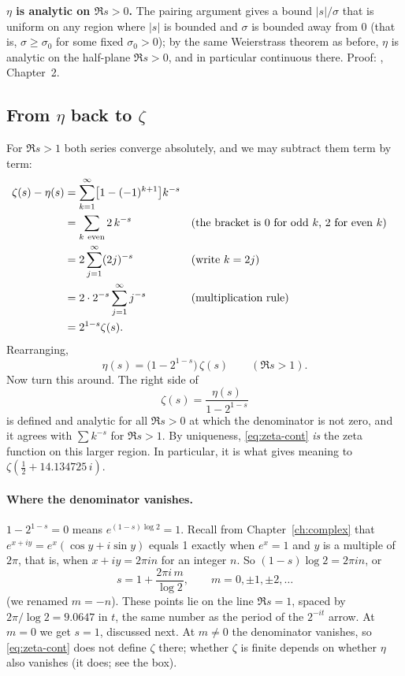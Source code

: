 \begin{beyond}
\textbf{$\eta$ is analytic on $\Re s>0$.} The pairing argument gives a bound $|s|/\sigma$ that is uniform on any region where $|s|$ is bounded and $\sigma$ is bounded away from $0$ (that is, $\sigma\ge\sigma_0$ for some fixed $\sigma_0>0$); by the same Weierstrass theorem as before, $\eta$ is analytic on the half-plane $\Re s>0$, and in particular continuous there. Proof: \cite{titchmarsh}, Chapter~2.
\end{beyond}

\subsection{From $\eta$ back to $\zeta$}

For $\Re s>1$ both series converge absolutely, and we may subtract them term by term:
\begin{align}
\zeta(s)-\eta(s)&=\sum_{k=1}^\infty\bigl[1-(-1)^{k+1}\bigr]k^{-s}\notag\\
&=\sum_{k\ \mathrm{even}}2\,k^{-s} &&\text{(the bracket is 0 for odd $k$, 2 for even $k$)}\notag\\
&=2\sum_{j=1}^{\infty}(2j)^{-s} &&\text{(write $k=2j$)}\notag\\
&=2\cdot2^{-s}\sum_{j=1}^\infty j^{-s} &&\text{(multiplication rule)}\notag\\
&=2^{1-s}\zeta(s).\notag
\end{align}
Rearranging,
\begin{equation}
\eta(s)=\bigl(1-2^{1-s}\bigr)\,\zeta(s)\qquad(\Re s>1).
\label{eq:zeta-etazeta}
\end{equation}
Now turn this around. The right side of
\begin{equation}
\zeta(s)=\frac{\eta(s)}{1-2^{1-s}}
\label{eq:zeta-cont}
\end{equation}
is defined and analytic for all $\Re s>0$ at which the denominator is not zero, and it agrees with $\sum k^{-s}$ for $\Re s>1$. By uniqueness, \cref{eq:zeta-cont} \emph{is} the zeta function on this larger region. In particular, it is what gives meaning to $\zeta(\tfrac12+14.134725\,i)$.

\paragraph{Where the denominator vanishes.} $1-2^{1-s}=0$ means $e^{(1-s)\log2}=1$. Recall from Chapter~\ref{ch:complex} that $e^{x+iy}=e^x(\cos y+i\sin y)$ equals 1 exactly when $e^x=1$ and $y$ is a multiple of $2\pi$, that is, when $x+iy=2\pi i n$ for an integer $n$. So $(1-s)\log2=2\pi i n$, or
\[
s=1+\frac{2\pi i\,m}{\log 2},\qquad m=0,\pm1,\pm2,\dots
\]
(we renamed $m=-n$). These points lie on the line $\Re s=1$, spaced by $2\pi/\log2=9.0647$ in $t$, the same number as the period of the $2^{-it}$ arrow. At $m=0$ we get $s=1$, discussed next. At $m\ne0$ the denominator vanishes, so \cref{eq:zeta-cont} does not define $\zeta$ there; whether $\zeta$ is finite depends on whether $\eta$ also vanishes (it does; see the box).


